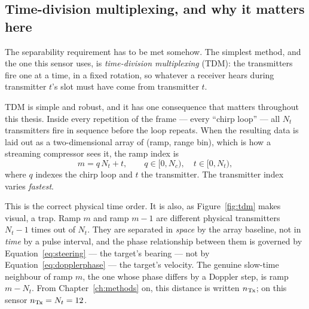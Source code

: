 \subsection{Time-division multiplexing, and why it matters here}
\label{sec:tdm}

The separability requirement has to be met somehow. The simplest method, and
the one this sensor uses, is \emph{time-division multiplexing} (TDM): the
transmitters fire one at a time, in a fixed rotation, so whatever a receiver
hears during transmitter $t$'s slot must have come from transmitter $t$.

TDM is simple and robust, and it has one consequence that matters throughout
this thesis. Inside every repetition of the frame --- every ``chirp loop''
--- all $N_t$ transmitters fire in sequence before the loop repeats. When the
resulting data is laid out as a two-dimensional array of (ramp, range bin),
which is how a streaming compressor sees it, the ramp index is
\begin{equation}
\label{eq:rampindex}
m = q\,N_t + t,
\qquad q \in [0, N_c), \quad t \in [0, N_t),
\end{equation}
where $q$ indexes the chirp loop and $t$ the transmitter. The transmitter index
varies \emph{fastest}.

This is the correct physical time order. It is also, as Figure~\ref{fig:tdm}
makes visual, a trap. Ramp $m$ and ramp $m-1$ are different physical
transmitters $N_t - 1$ times out of $N_t$. They are separated in \emph{space}
by the array baseline, not in \emph{time} by a pulse interval, and the phase
relationship between them is governed by Equation~\eqref{eq:steering} --- the
target's bearing --- not by Equation~\eqref{eq:dopplerphase} --- the target's
velocity. The genuine slow-time neighbour of ramp $m$, the one whose phase
differs by a Doppler step, is ramp $m - N_t$. From Chapter~\ref{ch:methods} on,
this distance is written $n_{\mathrm{Tx}}$; on this sensor $n_{\mathrm{Tx}} = N_t = 12$.

